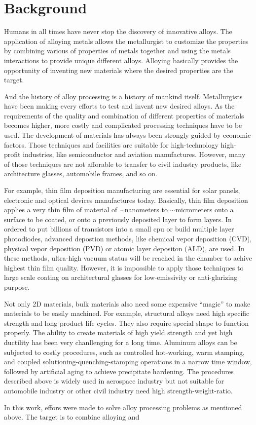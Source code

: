 \section{Background}

Humans in all times have never stop the discovery of innovative alloys. The application of alloying metals allows the metallurgist to customize the properties by combining various of properties of metals together and using the metals interactions to provide unique different alloys. Alloying basically provides the opportunity of inventing new materials where the desired properties are the target.

And the history of alloy processing is a history of mankind itself. Metallurgists have been making every efforts to test and invent new desired alloys. As the requirements of the quality and combination of different properties of materials becomes higher, more costly and complicated processing techniques have to be used. The development of materials has always been strongly guided by economic factors. Those techniques and facilities are suitable for high-technology high-profit industries, like semiconductor and aviation manufactures. However, many of those techniques are not afforable to transfer to civil industry products, like architecture glasses, automobile frames, and so on.

For example, thin film deposition manufacturing are essential for solar panels, electronic and optical devices manufactures today. Basically, thin film deposition applies a very thin film of material of $\sim$nanometers to $\sim$micrometers onto a surface to be coated, or onto a previously deposited layer to form layers. In ordered to put billions of transistors into a small cpu or build multiple layer photodiodes, advanced depostion methods, like chemical vepor deposition (CVD), physical vepor deposition (PVD) or atomic layer depositon (ALD), are used. In these methods, ultra-high vacuum status will be reached in the chamber to achive highest thin film quality. However, it is impossible to apply those techniques to large scale coating on architectural glasses for low-emissivity or anti-glarizing purpose.

Not only 2D materials, bulk materials also need some expensive ``magic'' to make materials to be easily machined. For example, structural alloys need high specific strength and long product life cycles. They also require special shape to function properly. The ability to create materials of high yield strength and yet high ductility has been very chanllenging for a long time. Aluminum alloys can be subjected to costly procedures, such as controlled hot-working, warm stamping, and coupled solutioning-quenching-stamping operations in a narrow time window, followed by artificial aging to achieve precipitate hardening. The procedures described above is widely used in aerospace industry but not suitable for automobile industry or other civil industry need high strength-weight-ratio.

In this work, effors were made to solve alloy processing problems as mentioned above. The target is to combine alloying and
